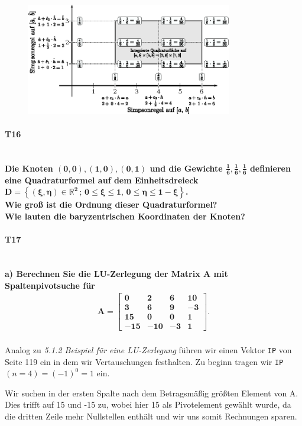 \documentclass[10pt,a4paper]{article}
\begin{document}
	\begin{figure}[htbp]
		\centering
		\includegraphics[width=0.8\textwidth]{T15.eps}
	\end{figure}
	\newpage
	\paragraph{T16}\mbox{}\\
	\textbf{%
	Die Knoten $\mathbf{(0,0), (1,0), (0,1)}$ und die Gewichte $\mathbf{\frac{1}{6},\frac{1}{6},\frac{1}{6}}$ definieren eine Quadraturformel auf dem Einheitsdreieck $\mathbf{D=\left\lbrace (\xi,\eta) \in \mathbb{R}^2 \,;\, 0\leq\xi\leq 1,\, 0\leq\eta \leq1-\xi \right\rbrace}$.\\
	Wie groß ist die Ordnung dieser Quadraturformel? \\
	Wie lauten die baryzentrischen Koordinaten der Knoten?
	}
	\newpage
	\paragraph{T17}\mbox{}\\
	\textbf{%
		a) Berechnen Sie die LU-Zerlegung der Matrix A mit Spaltenpivotsuche für
		\begin{align*}\mathbf{
			A= \begin{bmatrix}
				0   & 2   & 6  & 10 \\
				3   & 6   & 9  & -3 \\
				15  & 0   & 0  & 1  \\
				-15 & -10 & -3 & 1
			\end{bmatrix}.}
		\end{align*}
	}\\
    Analog zu \emph{5.1.2 Beispiel für eine LU-Zerlegung} führen wir einen Vektor \texttt{IP} von Seite 119 ein in dem wir Vertauschungen festhalten. Zu beginn tragen wir \texttt{IP}$(n=4)=(-1)^0=1$ ein.
    
    Wir suchen in der ersten Spalte nach dem Betragsmäßig größten Element von A. Dies trifft auf 15 und -15 zu, wobei hier 15 als Pivotelement gewählt wurde, da die dritten Zeile mehr Nullstellen enthält und wir uns somit Rechnungen sparen.
    
\end{document}
